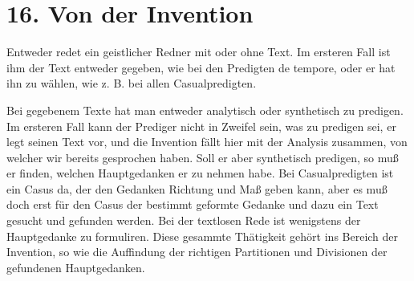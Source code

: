 \section{16. Von der Invention}

Entweder redet ein geistlicher Redner mit oder ohne Text. Im ersteren Fall ist ihm der Text entweder gegeben, wie bei den Predigten de tempore, oder er hat ihn zu wählen, wie z. B. bei allen Casualpredigten.

Bei gegebenem Texte hat man entweder analytisch oder synthetisch zu predigen. Im ersteren Fall kann der Prediger nicht in Zweifel sein, was zu predigen sei, er legt seinen Text vor, und die Invention fällt hier mit der Analysis zusammen, von welcher wir bereits gesprochen haben. Soll er aber synthetisch predigen, so muß er finden, welchen Hauptgedanken er zu nehmen habe. Bei Casualpredigten ist ein Casus da, der den Gedanken Richtung und Maß geben kann, aber es muß doch erst für den Casus der bestimmt geformte Gedanke und dazu ein Text gesucht und gefunden werden. Bei der textlosen Rede ist wenigstens der Hauptgedanke zu formuliren. Diese gesammte Thätigkeit gehört ins Bereich der Invention, so wie die Auffindung der richtigen Partitionen und Divisionen der gefundenen Hauptgedanken.

